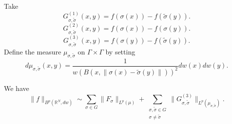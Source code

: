 \documentclass[12pt]{amsart}
\begin{document}
Take
$$G_{\sigma,\tilde{\sigma}}^{(1)}(x,y)=f(\sigma(x))-f(\tilde{\sigma}(y)).$$
$$G_{\sigma,\tilde{\sigma}}^{(2)}(x,y)=f(\sigma(x))-f(\sigma(y)).$$
$$G_{\sigma,\tilde{\sigma}}^{(3)}(x,y)=f(\sigma(y))-f(\tilde{\sigma}(y)).$$
Define the measure $\mu_{\sigma,\tilde{\sigma}}$ on $\Gamma\times \Gamma$ by setting
$$d\mu_{\sigma,\tilde{\sigma}}(x,y)=\frac{1}{w(B(x,\|\sigma(x)-\tilde{\sigma}(y)\|))^2}dw(x)dw(y).$$

\begin{lemma}\label{lem:non-dunkl-G3}
We have
\[
\|f\|_{B^p(\mathbb R^N,dw)}
\sim
\sum_{\sigma\in G}\|F_\sigma\|_{L^p(\mu)}
+
\sum_{\substack{\sigma,\tilde{\sigma}\in G\\ \sigma\neq \tilde{\sigma}}}
\|G_{\sigma,\tilde{\sigma}}^{(3)}\|_{L^p(\mu_{\sigma,\tilde{\sigma}})}.
\]
\end{lemma}
\end{document}
